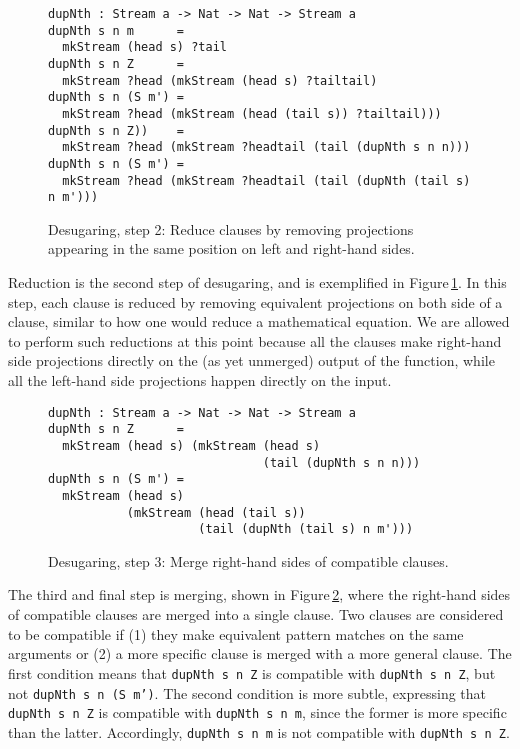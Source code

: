 \begin{figure}
\begin{lstlisting}[mathescape]
dupNth : Stream a -> Nat -> Nat -> Stream a
dupNth s n m      = 
  mkStream (head s) ?tail
dupNth s n Z      = 
  mkStream ?head (mkStream (head s) ?tailtail)
dupNth s n (S m') = 
  mkStream ?head (mkStream (head (tail s)) ?tailtail)))
dupNth s n Z))    = 
  mkStream ?head (mkStream ?headtail (tail (dupNth s n n)))
dupNth s n (S m') = 
  mkStream ?head (mkStream ?headtail (tail (dupNth (tail s) n m')))
\end{lstlisting}
\caption{Desugaring, step 2: Reduce clauses by removing projections appearing in the same position on left and right-hand sides.}
\label{fig:desugar_step2}
\end{figure}

Reduction is the second step of desugaring, and is exemplified in Figure\,\ref{fig:desugar_step2}. In this step, each clause is reduced by removing equivalent projections on both side of a clause, similar to how one would reduce a mathematical equation. We are allowed to perform such reductions at this point because all the clauses make right-hand side projections directly on the (as yet unmerged) output of the function, while all the left-hand side projections happen directly on the input.

\begin{figure}
\begin{lstlisting}[mathescape]
dupNth : Stream a -> Nat -> Nat -> Stream a
dupNth s n Z      = 
  mkStream (head s) (mkStream (head s) 
                              (tail (dupNth s n n)))
dupNth s n (S m') = 
  mkStream (head s) 
           (mkStream (head (tail s)) 
                     (tail (dupNth (tail s) n m')))
\end{lstlisting}
\caption{Desugaring, step 3: Merge right-hand sides of compatible clauses.}
\label{fig:desugar_step3}
\end{figure}

The third and final step is merging, shown in Figure\,\ref{fig:desugar_step3}, where the right-hand sides of compatible clauses are merged into a single clause. Two clauses are considered to be compatible if (1) they make equivalent pattern matches on the same arguments or (2) a more specific clause is merged with a more general clause. The first condition means that \texttt{dupNth s n Z} is compatible with \texttt{dupNth s n Z}, but not \texttt{dupNth s n (S~m')}. The second condition is more subtle, expressing that \texttt{dupNth s n Z} is compatible with \texttt{dupNth s n m}, since the former is more specific than the latter. Accordingly, \texttt{dupNth s n m} is not compatible with \texttt{dupNth s n Z}.

